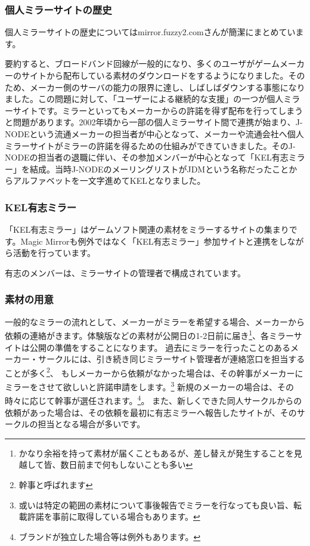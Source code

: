 \subsubsection{個人ミラーサイトの歴史}
個人ミラーサイトの歴史についてはmirror.fuzzy2.comさんが簡潔にまとめています。\cite{fuzzy2_1}

要約すると、ブロードバンド回線が一般的になり、多くのユーザがゲームメーカーのサイトから配布している素材のダウンロードをするようになりました。そのため、メーカー側のサーバの能力の限界に達し、しばしばダウンする事態になりました。この問題に対して、「ユーザーによる継続的な支援」の一つが個人ミラーサイトです。ミラーといってもメーカーからの許諾を得ず配布を行ってしまうと問題があります。2002年頃から一部の個人ミラーサイト間で連携が始まり、J-NODEという流通メーカーの担当者が中心となって、メーカーや流通会社へ個人ミラーサイトがミラーの許諾を得るための仕組みができていきました。そのJ-NODEの担当者の退職に伴い、その参加メンバーが中心となって「KEL有志ミラー」を結成。当時J-NODEのメーリングリストがJDMという名称だったことからアルファベットを一文字進めてKELとなりました。\cite{XES}


\subsubsection{KEL有志ミラー}

「KEL有志ミラー」はゲームソフト関連の素材をミラーするサイトの集まりです。Magic Mirrorも例外ではなく「KEL有志ミラー」参加サイトと連携をしながら活動を行っています。

有志のメンバーは、ミラーサイトの管理者で構成されています。

\subsubsection{素材の用意}

一般的なミラーの流れとして、メーカーがミラーを希望する場合、メーカーから依頼の連絡がきます。体験版などの素材が公開日の1-2日前に届き\footnote{かなり余裕を持って素材が届くこともあるが、差し替えが発生することを見越して皆、数日前まで何もしないことも多い}、各ミラーサイトは公開の準備をすることになります。%
過去にミラーを行ったことのあるメーカー・サークルには、引き続き同じミラーサイト管理者が連絡窓口を担当することが多く\footnote{幹事と呼ばれます}、%
もしメーカーから依頼がなかった場合は、その幹事がメーカーにミラーをさせて欲しいと許諾申請をします。\footnote{或いは特定の範囲の素材について事後報告でミラーを行なっても良い旨、転載許諾を事前に取得している場合もあります。}%
新規のメーカーの場合は、その時々に応じて幹事が選任されます。\footnote{ブランドが独立した場合等は例外もあります。}。%
また、新しくできた同人サークルからの依頼があった場合は、その依頼を最初に有志ミラーへ報告したサイトが、そのサークルの担当となる場合が多いです。\cite{XES}

